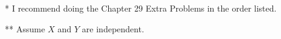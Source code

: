\documentclass[12pt]{article}
\begin{document}




%




* I recommend doing the Chapter 29 Extra Problems in the order listed.


** Assume $X$ and $Y$ are independent.


%
%
%



\end{document}
